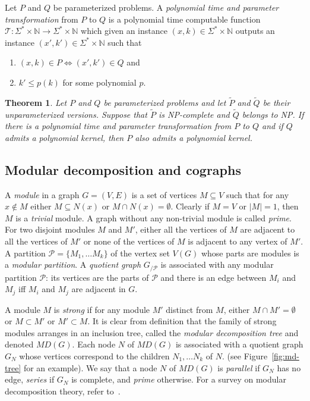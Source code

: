 \documentclass[11pt]{article}
\newtheorem{theorem}[lemma]{Theorem}
\begin{document}
Let $P$ and $Q$ be parameterized problems. A \emph{polynomial time and parameter transformation} from $P$ to $Q$ is a polynomial time computable function $\mathcal{T}:\Sigma^*\times \mathbb{N}\rightarrow \Sigma^*\times \mathbb{N}$ which given an instance $(x,k)\in \Sigma^*\times \mathbb{N}$ outputs an instance $(x',k')\in \Sigma^*\times \mathbb{N}$ such that 
\begin{enumerate}
\item $(x,k)\in P \Leftrightarrow (x',k')\in Q$ and

\item $k'\leqslant p(k)$ for some polynomial $p$.
\end{enumerate}

\begin{theorem}\cite{BTY09}\label{th:ppt}
Let $P$ and $Q$ be parameterized problems and let $\tilde{P}$ and $\tilde{Q}$ be their unparameterized versions. Suppose that $\tilde{P}$ is NP-complete and $\tilde{Q}$ belongs to NP. If there is a polynomial time and parameter transformation from $P$ to $Q$ and if $Q$ admits a polynomial kernel, then $P$ also admits a polynomial kernel.
\end{theorem}

\subsection{Modular decomposition and cographs}

A \emph{module} in a graph $G=(V,E)$ is a set of vertices $M\subseteq V$ such that for any $x\notin M$ either $M\subseteq N(x)$ or $M\cap N(x)=\emptyset$. Clearly if $M=V$ or $|M|=1$, then $M$ is a \emph{trivial} module. A graph without any non-trivial module is called \emph{prime}. 
For two disjoint modules $M$ and $M'$, either all the vertices of $M$ are adjacent to all the vertices of $M'$ or none of the vertices of $M$ is adjacent to any vertex of $M'$. A partition $\mathcal{P}=\{M_1,\dots M_k\}$ of the vertex set $V(G)$ whose parts are modules is a \emph{modular partition}. A \emph{quotient graph} $G_{/\mathcal{P}}$ is associated with any modular partition $\mathcal{P}$: its vertices are the parts of $\mathcal{P}$ and there is an edge between $M_i$ and $M_j$ iff $M_i$ and $M_j$ are adjacent in $G$.

A module $M$ is \emph{strong} if for any module $M'$ distinct from $M$, either $M\cap M'=\emptyset$ or $M\subset M'$ or $M'\subset M$. It is clear from definition that the family of strong modules arranges in an inclusion tree, called the \emph{modular decomposition tree} and denoted $MD(G)$. Each node $N$ of $MD(G)$ is associated with a quotient graph $G_N$ whose vertices correspond to the children $N_1,\dots N_k$ of $N$. (see Figure~\ref{fig:md-tree} for an example). 
We say that a node $N$ of $MD(G)$ is \emph{parallel} if $G_N$ has no edge, \emph{series} if $G_N$ is complete, and \emph{prime} otherwise. 
For a survey on modular decomposition theory, refer to~\cite{HP10}.
\end{document}
